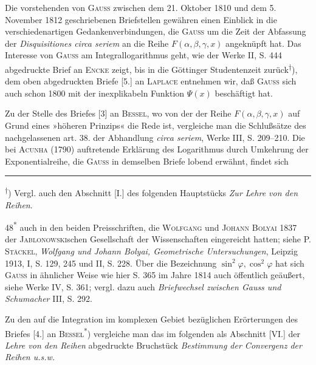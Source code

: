 {\small
\noindent\hspace*{\parindent}Die vorstehenden von \textsc{Gauss} zwischen dem 21. Oktober 1810 und dem 5. November 1812 geschriebenen Briefstellen gewähren einen Einblick in die verschiedenartigen Gedankenverbindungen, die \textsc{Gauss} um die Zeit der Abfassung der \textit{Disquisitiones circa seriem} an die Reihe \(F(\alpha,\beta,\gamma,x)\) angeknüpft hat. Das Interesse von \textsc{Gauss} am Integrallogarithmus geht, wie der Werke II, S. 444 abgedruckte Brief an \textsc{Encke} zeigt, bis in die Göttinger Studentenzeit zurück\textsuperscript{\(\dagger\)}), dem oben abgedruckten Briefe [5.] an \textsc{Laplace} entnehmen wir, daß \textsc{Gauss} sich auch schon 1800 mit der inexplikabeln Funktion \(\Psi(x)\) beschäftigt hat.

\indent Zu der Stelle des Briefes [3] an \textsc{Bessel}, wo von der  der Reihe \(F(\alpha,\beta,\gamma,x)\) auf Grund eines »höheren Prinzips« die Rede ist, vergleiche man die Schlußsätze des nachgelassenen art. 38. der Abhandlung \textit{circa seriem}, Werke III, S. 209–210. Die bei \textsc{Acunha} (1790) auftretende Erklärung des Logarithmus durch Umkehrung der Exponentialreihe, die \textsc{Gauss} in demselben Briefe lobend erwähnt, findet sich
\par\medskip\noindent\rule{.24\linewidth}{.4pt}\par\smallskip
\noindent\hspace*{\parindent}\textsuperscript{\(\dagger\)}) Vergl. auch den Abschnitt [I.] des folgenden Hauptstücks \textit{Zur Lehre von den Reihen}.
\par\smallskip\noindent\hfill48\textsuperscript{*}
\clearpage{}
\noindent auch in den beiden Preisschriften, die \textsc{Wolfgang} und \textsc{Johann Bolyai} 1837 der \textsc{Jablonowski}schen Gesellschaft der Wissenschaften eingereicht hatten; siehe P. \textsc{Stäckel}, \textit{Wolfgang und Johann Bolyai, Geometrische Untersuchungen}, Leipzig 1913, I, S. 129, 245 und II, S. 228. Über die Bezeichnung \(\sin^2\varphi,\cos^2\varphi\) hat sich \textsc{Gauss} in ähnlicher Weise wie hier S. 365 im Jahre 1814 auch öffentlich geäußert, siehe Werke IV, S. 361; vergl. dazu auch \textit{Briefwechsel zwischen Gauss und Schumacher} III, S. 292.

\indent Zu den auf die Integration im komplexen Gebiet bezüglichen Erörterungen des Briefes [4.] an \textsc{Bessel}\textsuperscript{*}) vergleiche man das im folgenden als Abschnitt [VI.] der \textit{Lehre von den Reihen} abgedruckte Bruchstück \textit{Bestimmung der Convergenz der Reihen u.s.w.}

}
